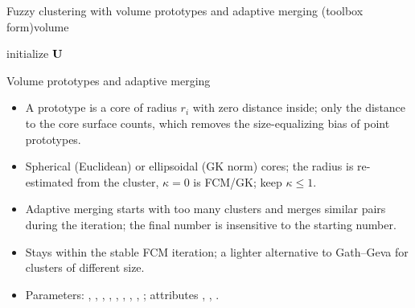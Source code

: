 \begin{algobox}{Fuzzy clustering with volume prototypes and adaptive merging (toolbox form)}{volume}
\begin{algorithm}[H]
initialize $\mathbf{U}$\;
\end{algorithm}
\end{algobox}
\begin{summarybox}{Volume prototypes and adaptive merging}
\begin{itemize}
  \item A prototype is a core of radius $r_i$ with zero distance inside; only the distance to the core surface counts, which removes the size-equalizing bias of point prototypes.
  \item Spherical (Euclidean) or ellipsoidal (GK norm) cores; the radius is re-estimated from the cluster, $\kappa=0$ is FCM/GK; keep $\kappa\le1$.
  \item Adaptive merging starts with too many clusters and merges similar pairs during the iteration; the final number is insensitive to the starting number.
  \item Stays within the stable FCM iteration; a lighter alternative to Gath--Geva for clusters of different size.
  \item Parameters: , , , , , , , , ; attributes , , .
\end{itemize}
\end{summarybox}

